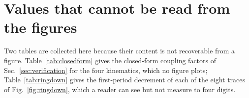 \section{Values that cannot be read from the figures}
\label{app:data}
\setcounter{table}{0}
\setcounter{figure}{0}

Two tables are collected here because their content is not recoverable from a
figure. Table~\ref{tab:closedform} gives the closed-form coupling factors of
Sec.~\ref{sec:verification} for the four kinematics, which no figure plots;
Table~\ref{tab:ringdown} gives the first-period decrement of each of the eight
traces of Fig.~\ref{fig:ringdown}, which a reader can see but not measure to
four digits.

\begin{table}[!htbp]
\centering
\small
\caption{Coupling factor from the constitutive tensors alone for the four
kinematics, with the coupling strength $e^{\mathsf T}C^{-1}e/\kappa$ they
share. The three finite element rows below the rule are mode-free values of
\eqref{eq:kstatic}, plane stress, poling $x$, window off.}
\label{tab:closedform}

\end{table}



\FloatBarrier
